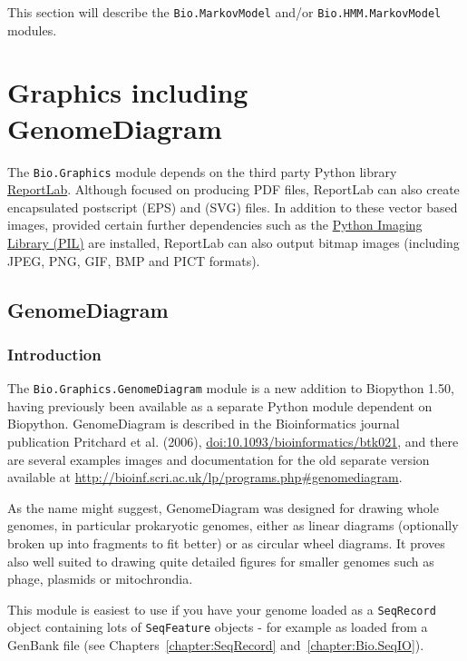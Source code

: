 \documentclass{report}
\begin{document}
This section will describe the \verb|Bio.MarkovModel| and/or \verb|Bio.HMM.MarkovModel| modules.

\chapter{Graphics including GenomeDiagram}
\label{chapter:graphics}

The \verb|Bio.Graphics| module depends on the third party Python library
\href{http://www.reportlab.org}{ReportLab}.  Although focused on producing PDF files,
ReportLab can also create encapsulated postscript (EPS) and (SVG) files.  In addition
to these vector based images, provided certain further dependencies such as the
\href{http://www.pythonware.com/products/pil/}{Python Imaging Library (PIL)} are
installed, ReportLab can also output bitmap images (including JPEG, PNG, GIF, BMP
and PICT formats).

\section{GenomeDiagram}
\label{sec:genomediagram}
\subsection{Introduction}

The \verb|Bio.Graphics.GenomeDiagram| module is a new addition to Biopython 1.50,
having previously been available as a separate Python module dependent on Biopython.
GenomeDiagram is described in the Bioinformatics journal publication Pritchard et al. (2006),
\href{http://dx.doi.org/10.1093/bioinformatics/btk021}{doi:10.1093/bioinformatics/btk021},
and there are several examples images and documentation for the old separate version
available at \url{http://bioinf.scri.ac.uk/lp/programs.php#genomediagram}.

As the name might suggest, GenomeDiagram was designed for drawing whole genomes, in
particular prokaryotic genomes, either as linear diagrams (optionally broken up into
fragments to fit better) or as circular wheel diagrams.  It proves also well suited
to drawing quite detailed figures for smaller genomes such as phage, plasmids or
mitochrondia.

This module is easiest to use if you have your genome loaded as a \verb|SeqRecord|
object containing lots of \verb|SeqFeature| objects - for example as loaded from a
GenBank file (see Chapters~\ref{chapter:SeqRecord} and~\ref{chapter:Bio.SeqIO}).
\end{document}
